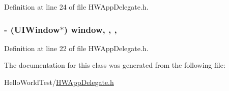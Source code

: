 Definition at line 24 of file H\-W\-App\-Delegate.\-h.

\hypertarget{interface_h_w_app_delegate_ac8271df4ea48850f9df0a265dfc6f213}{
\subsubsection[{window}]{\setlength{\rightskip}{0pt plus 5cm}-\/ (U\-I\-Window$\ast$) window\hspace{0.3cm}{\ttfamily [read]}, {\ttfamily [write]}, {\ttfamily [nonatomic]}, {\ttfamily [strong]}}}\label{interface_h_w_app_delegate_ac8271df4ea48850f9df0a265dfc6f213}


Definition at line 22 of file H\-W\-App\-Delegate.\-h.



The documentation for this class was generated from the following file\-:\begin{DoxyCompactItemize}
\item 
Hello\-World\-Test/\hyperlink{_h_w_app_delegate_8h}{H\-W\-App\-Delegate.\-h}\end{DoxyCompactItemize}

